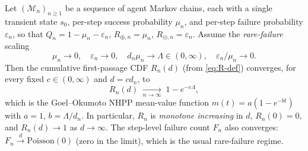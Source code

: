 \begin{proposition}
\label{thm:nhpp}
Let $(\mathcal{M}_n)_{n\ge 1}$ be a sequence of agent Markov chains,
each with a single transient state $s_0$, per-step success probability
$\mu_n$, and per-step failure probability $\varepsilon_n$, so that
$Q_n = 1-\mu_n-\varepsilon_n$,
$R_{\oplus,n}=\mu_n$, $R_{\ominus,n}=\varepsilon_n$.  Assume the
\emph{rare-failure} scaling
\begin{equation}
\mu_n\to 0,\quad \varepsilon_n\to 0,\quad
d_n\mu_n\to \Lambda\in(0,\infty),\quad
\varepsilon_n/\mu_n\to 0.
\label{eq:t5-scaling}
\end{equation}
Then the cumulative first-passage CDF $R_n(d)$ (from \eqref{eq:R-def})
converges, for every fixed $c\in(0,\infty)$ and $d=cd_n$, to
\begin{equation}
R_n(d)\;\xrightarrow[n\to\infty]{}\; 1-e^{-c\Lambda},
\label{eq:t5-GO}
\end{equation}
which is the Goel--Okumoto NHPP mean-value function
$m(t)=a(1-e^{-bt})$ with $a=1$, $b=\Lambda/d_n$. In particular,
$R_n$ is \emph{monotone increasing} in $d$, $R_n(0)=0$, and
$R_n(d)\to 1$ as $d\to\infty$.  The step-level failure count
$F_n$ also converges: $F_n\xrightarrow{d}\mathrm{Poisson}(0)$ (zero in
the limit), which is the usual rare-failure regime.
\end{proposition}

